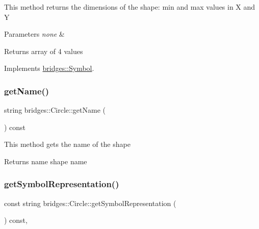 This method returns the dimensions of the shape\+: min and max values in X and Y


\begin{DoxyParams}{Parameters}
{\em none} & \\
\hline
\end{DoxyParams}
\begin{DoxyReturn}{Returns}
array of 4 values 
\end{DoxyReturn}


Implements \mbox{\hyperlink{classbridges_1_1_symbol_a6eb190dc71b31b344b7610a07c6dc1d5}{bridges\+::\+Symbol}}.

\mbox{\label{classbridges_1_1_circle_ae3aba409ad5868406efa736434ada2fa}} 
\subsubsection{\texorpdfstring{getName()}{getName()}}
{\footnotesize\ttfamily string bridges\+::\+Circle\+::get\+Name (\begin{DoxyParamCaption}{ }\end{DoxyParamCaption}) const\hspace{0.3cm}{\ttfamily [inline]}}

This method gets the name of the shape

\begin{DoxyReturn}{Returns}
name shape name 
\end{DoxyReturn}
\mbox{\label{classbridges_1_1_circle_aaee59a0d8ad00c75f7547bac2cfabd38}} 
\subsubsection{\texorpdfstring{getSymbolRepresentation()}{getSymbolRepresentation()}}
{\footnotesize\ttfamily const string bridges\+::\+Circle\+::get\+Symbol\+Representation (\begin{DoxyParamCaption}{ }\end{DoxyParamCaption}) const\hspace{0.3cm}{\ttfamily [inline]}, {\ttfamily [virtual]}}

